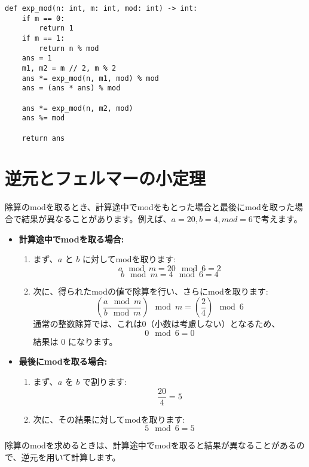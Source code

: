 \documentclass{jlreq}
\begin{document}
\begin{lstlisting}[caption=繰り返し二乗法の実装, label=power, frame=TRBL]
def exp_mod(n: int, m: int, mod: int) -> int:
    if m == 0:
        return 1
    if m == 1:
        return n % mod
    ans = 1
    m1, m2 = m // 2, m % 2
    ans *= exp_mod(n, m1, mod) % mod
    ans = (ans * ans) % mod
    
    ans *= exp_mod(n, m2, mod)
    ans %= mod
    
    return ans
\end{lstlisting}

\section{逆元とフェルマーの小定理}

除算のmodを取るとき、計算途中でmodをもとった場合と最後にmodを取った場合で結果が異なることがあります。例えば、$a = 20, b = 4, mod = 6$で考えます。

\begin{itemize}
    \item \textbf{計算途中でmodを取る場合:}
    \begin{enumerate}
        \item まず、\( a \) と \( b \) に対してmodを取ります:
        \[
        a \mod m = 20 \mod 6 = 2
        \]
        \[
        b \mod m = 4 \mod 6 = 4
        \]
        \item 次に、得られたmodの値で除算を行い、さらにmodを取ります:
        \[
        \left(\frac{a \mod m}{b \mod m}\right) \mod m = \left(\frac{2}{4}\right) \mod 6
        \]
        通常の整数除算では、これは0（小数は考慮しない）となるため、
        \[
        0 \mod 6 = 0
        \]
        結果は \( 0 \) になります。
    \end{enumerate}

    \item \textbf{最後にmodを取る場合:}
    \begin{enumerate}
        \item まず、\( a \) を \( b \) で割ります:
        \[
        \frac{20}{4} = 5
        \]
        \item 次に、その結果に対してmodを取ります:
        \[
        5 \mod 6 = 5
        \]
    \end{enumerate}
\end{itemize}

除算のmodを求めるときは、計算途中でmodを取ると結果が異なることがあるので、逆元を用いて計算します。
\end{document}
